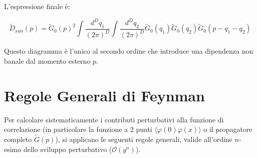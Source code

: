 L'espressione finale è:
\begin{tcolorbox}[colback=colorA!10, colframe=colorB!60!colorA,  title=\textbf{Diagramma a Cactus}]
\begin{equation}
\tilde{D}_{sun}(p) = \tilde{G}_0(p)^2 \int \frac{d^D q_1}{(2\pi)^D} \int \frac{d^D q_2}{(2\pi)^D} \tilde{G}_0(q_1) \tilde{G}_0(q_2) \tilde{G}_0(p - q_1 - q_2)
\end{equation}
\end{tcolorbox}


\noindent Questo diagramma è l'unico al secondo ordine che introduce una dipendenza non banale dal momento esterno $p$.

\newpage
\section{Regole Generali di Feynman}

Per calcolare sistematicamente i contributi perturbativi alla funzione di correlazione (in particolare la funzione a 2 punti $\langle \varphi(0)\varphi(x) \rangle$ o il propagatore completo $\tilde{G}(p)$), si applicano le seguenti regole generali, valide all'ordine $n$-esimo dello sviluppo perturbativo ($\mathcal{O}(g^n)$).


